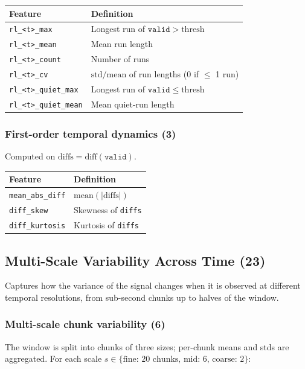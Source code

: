 \documentclass[11pt,a4paper]{article}
\begin{document}
\begin{tabular}{@{}lp{10cm}@{}}
\toprule
\textbf{Feature} & \textbf{Definition} \\
\midrule
\texttt{rl\_<t>\_max}        & Longest run of $\texttt{valid} > \mathrm{thresh}$ \\
\texttt{rl\_<t>\_mean}       & Mean run length \\
\texttt{rl\_<t>\_count}      & Number of runs \\
\texttt{rl\_<t>\_cv}         & $\mathrm{std} / \mathrm{mean}$ of run lengths (0 if $\le$ 1 run) \\
\texttt{rl\_<t>\_quiet\_max} & Longest run of $\texttt{valid} \le \mathrm{thresh}$ \\
\texttt{rl\_<t>\_quiet\_mean}& Mean quiet-run length \\
\bottomrule
\end{tabular}

\subsubsection*{First-order temporal dynamics (3)}

Computed on $\mathrm{diffs} = \mathrm{diff}(\texttt{valid})$.

\begin{tabular}{@{}lp{10cm}@{}}
\toprule
\textbf{Feature} & \textbf{Definition} \\
\midrule
\texttt{mean\_abs\_diff} & $\mathrm{mean}(|\mathrm{diffs}|)$ \\
\texttt{diff\_skew}      & Skewness of \texttt{diffs} \\
\texttt{diff\_kurtosis}  & Kurtosis of \texttt{diffs} \\
\bottomrule
\end{tabular}

\subsection{Multi-Scale Variability Across Time (23)}

Captures how the variance of the signal changes when it is observed at
different temporal resolutions, from sub-second chunks up to halves of the
window.

\subsubsection*{Multi-scale chunk variability (6)}

The window is split into chunks of three sizes; per-chunk means and stds are
aggregated. For each scale
$s \in \{\text{fine: 20 chunks},\, \text{mid: 6},\, \text{coarse: 2}\}$:
\end{document}
